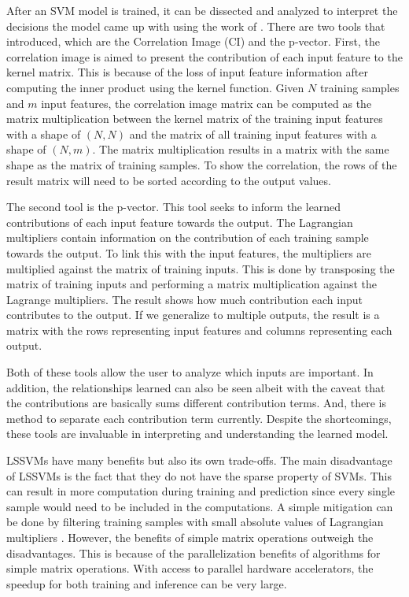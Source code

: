 After an SVM model is trained, it can be dissected and analyzed to interpret the decisions the model came up with using the work of \textcite{ustunVisualisationInterpretationSupport2007}. There are two tools that \autocite{ustunVisualisationInterpretationSupport2007} introduced, which are the Correlation Image (CI) and the p-vector. First, the correlation image is aimed to present the contribution of each input feature to the kernel matrix. This is because of the loss of input feature information after computing the inner product using the kernel function. Given \(N\) training samples and \(m\) input features, the correlation image matrix can be computed as the matrix multiplication between the kernel matrix of the training input features with a shape of \((N,N)\) and the matrix of all training input features with a shape of \((N,m)\). The matrix multiplication results in a matrix with the same shape as the matrix of training samples. To show the correlation, the rows of the result matrix will need to be sorted according to the output values.

The second tool is the p-vector. This tool seeks to inform the learned contributions of each input feature towards the output. The Lagrangian multipliers contain information on the contribution of each training sample towards the output. To link this with the input features, the multipliers are multiplied against the matrix of training inputs. This is done by transposing the matrix of training inputs and performing a matrix multiplication against the Lagrange multipliers. The result shows how much contribution each input contributes to the output. If we generalize to multiple outputs, the result is a matrix with the rows representing input features and columns representing each output.

Both of these tools allow the user to analyze which inputs are important. In addition, the relationships learned can also be seen albeit with the caveat that the contributions are basically sums different contribution terms. And, there is method to separate each contribution term currently. Despite the shortcomings, these tools are invaluable in interpreting and understanding the learned model.

LSSVMs have many benefits but also its own trade-offs. The main disadvantage of LSSVMs is the fact that they do not have the sparse property of SVMs. This can result in more computation during training and prediction since every single sample would need to be included in the computations. A simple mitigation can be done by filtering training samples with small absolute values of Lagrangian multipliers \autocite{haifengwangComparisonSVMLSSVM2005}. However, the benefits of simple matrix operations outweigh the disadvantages. This is because of the parallelization benefits of algorithms for simple matrix operations. With access to parallel hardware accelerators, the speedup for both training and inference can be very large.

